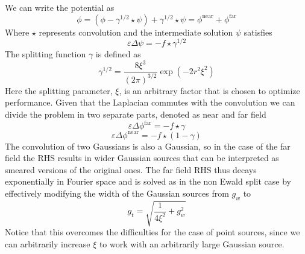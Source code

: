 \documentclass[ twoside,openright,titlepage,numbers=noenddot,%
headinclude,footinclude,cleardoublepage=empty,abstract=on,
BCOR=5mm,paper=a4,fontsize=11pt, dvipsnames
]{scrreprt}
\newcommand{\near}{\textrm{near}}
\newcommand{\far}{\textrm{far}}
\begin{document}
We can write the potential as
\begin{equation}
 \phi=(\phi - \gamma^{1/2}\star\psi) + \gamma^{1/2}\star\psi = \phi^{\near} + \phi^{\far}
\end{equation}
Where $\star$ represents convolution and the intermediate solution $\psi$ satisfies
 \begin{equation}
 \varepsilon\Delta\psi=-f\star\gamma^{1/2}
\end{equation}   
The splitting function $\gamma$ is defined as
 \begin{equation}
 \gamma^{1/2} = \frac{8\xi^3}{(2\pi)^{3/2}}\exp\left(-2r^2\xi^2\right)
\end{equation}
Here the splitting parameter, $\xi$, is an arbitrary factor that is chosen to optimize performance. 
Given that the Laplacian commutes with the convolution we can divide the problem in two separate parts, denoted as near and far field  
 \begin{equation}
 \varepsilon\Delta\phi^{\far}=-f\star\gamma
\end{equation}   
\begin{equation}
 \label{tppoisson_ewald_near}
 \varepsilon\Delta\phi^{\near}=-f\star(1-\gamma)
\end{equation}   
The convolution of two Gaussians is also a Gaussian, so in the case of the far field the RHS results in wider Gaussian sources that can be interpreted as smeared versions of the original ones. The far field RHS thus decays exponentially in Fourier space and is solved as in the non Ewald split case by effectively modifying the width of the Gaussian sources from $g_w$ to
\begin{equation}
  g_t = \sqrt{\frac{1}{4\xi^2} + g_w^2}
\end{equation}
Notice that this overcomes the difficulties for the case of point sources, since we can arbitrarily increase $\xi$ to work with an arbitrarily large Gaussian source.
\end{document}
